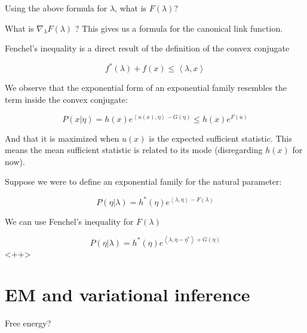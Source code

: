 \documentclass[a4paper]{article}
\begin{document}
Using the above formula for $\lambda$, what is $F(\lambda)$?  

What is $\nabla_\lambda F(\lambda)$ ?  This gives us a formula for the canonical link function.

Fenchel's inequality is a direct result of the definition of the convex conjugate

\begin{equation}
  f^*( \lambda) + f(x) \leq \left< \lambda, x \right>
  \label{Fenchel's inequality}
\end{equation}

We observe that the exponential form of an exponential family resembles the term inside the convex conjugate:

\begin{equation}
  P( x \vert \eta) = h(x) e^{ \left< u(x), \eta \right> - G(\eta) } \leq h(x) e^{ F( \bar{u} ) }
  \label{}
\end{equation}

And that it is maximized when $u(x)$ is the expected sufficient statistic.  This means the mean sufficient statistic is related to its mode (disregarding $h(x)$ for now).  

Suppose we were to define an exponential family for the natural parameter:

\begin{equation}
  P( \eta \vert \lambda ) = h^*(\eta) e^{ \left< \lambda, \eta \right> - F(\lambda) }
  \label{}
\end{equation}

We can use Fenchel's inequality for $F(\lambda)$

\begin{equation}
  P( \eta \vert \lambda ) = h^*(\eta) e^{ \left< \lambda, \eta - \eta^* \right> + G(\eta) }
  \label{<++>}
\end{equation}<++>

\section{EM and variational inference}

Free energy?
\end{document}
